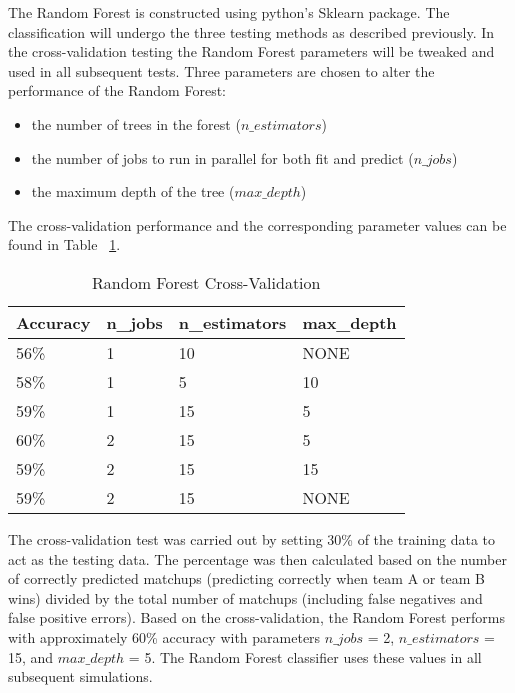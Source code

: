 \documentclass[conference]{IEEEtran}
\begin{document}
The Random Forest is constructed using python's Sklearn package. The classification will undergo the three testing methods as described previously. In the cross-validation testing the Random Forest parameters will be tweaked and used in all subsequent tests. Three parameters are chosen to alter the performance of the Random Forest:
\begin{itemize}
\item the number of trees in the forest ($n\_estimators$)
\item the number of jobs to run in parallel for both fit and predict ($n\_jobs$)
\item the maximum depth of the tree ($max\_depth$)
\end{itemize}

The cross-validation performance and the corresponding parameter values can be found in Table ~\ref{tab:RF_CV}.

\begin{table}[H]
	\centering
    \begin{tabular}{|l|l|l|l|}
    \hline
    \textbf{Accuracy} & \textbf{n\_jobs} & \textbf{n\_estimators} & \textbf{max\_depth} \\ \hline
    56\%     & 1       & 10            & NONE       \\ \hline
    58\%     & 1       & 5             & 10         \\ \hline
    59\%     & 1       & 15            & 5          \\ \hline
    60\%     & 2       & 15            & 5          \\ \hline
    59\%     & 2       & 15            & 15         \\ \hline
    59\%     & 2       & 15            & NONE       \\ \hline
    \end{tabular}
    \caption {Random Forest Cross-Validation}
    \label{tab:RF_CV}
\end{table}

The cross-validation test was carried out by setting 30\% of the training data to act as the testing data. The percentage was then calculated based on the number of correctly predicted matchups (predicting correctly when team A or team B wins) divided by the total number of matchups (including false negatives and false positive errors).  Based on the cross-validation, the Random Forest performs with approximately 60\% accuracy with parameters $n\_jobs$ = 2, $n\_estimators$ = 15, and $max\_depth$ = 5. The Random Forest classifier uses these values in all subsequent simulations.
\end{document}
